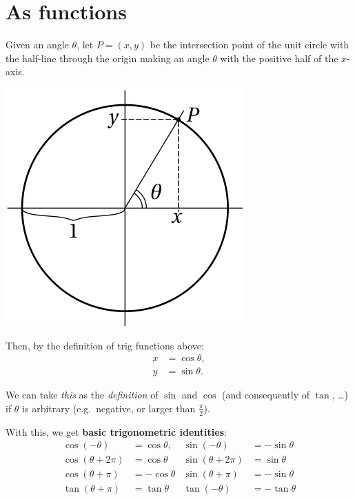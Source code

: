 \documentclass[
  12pt,
  oneside]{book}
\theoremstyle{definition}
\theoremstyle{definition}
\theoremstyle{definition}
\theoremstyle{definition}
\theoremstyle{remark}
\begin{document}
\hypertarget{as-functions}{%
\section{As functions}\label{as-functions}}

Given an angle \(\theta\), let \(P=(x,y)\) be the intersection point of the unit circle with the half-line through the origin making an angle \(\theta\) with the positive half of the \(x\)-axis.

\begin{center}\includegraphics{t15-circle1} \end{center}

Then, by the definition of trig functions above:
\begin{align*}
x&= \cos\theta,\\
y&= \sin\theta.
\end{align*}

We can take \emph{this} as the \emph{definition} of \(\sin\) and \(\cos\) (and consequently of \(\tan\), \ldots) if \(\theta\) is arbitrary (e.g.~negative, or larger than \(\frac\pi2\)).

With this, we get \textbf{basic trigonometric identities}:
\begin{align*}
    \cos(-\theta) &=\cos\theta, & \sin(-\theta) &=-\sin\theta \\
    \cos(\theta+2\pi) &=\cos\theta & \sin(\theta+2\pi) &=\sin\theta\\
    \cos(\theta+\pi) &= -\cos\theta & \sin(\theta+\pi) &= -\sin\theta\\
    \tan(\theta+\pi) &= \tan\theta & \tan(-\theta) &= -\tan\theta
\end{align*}
\end{document}
